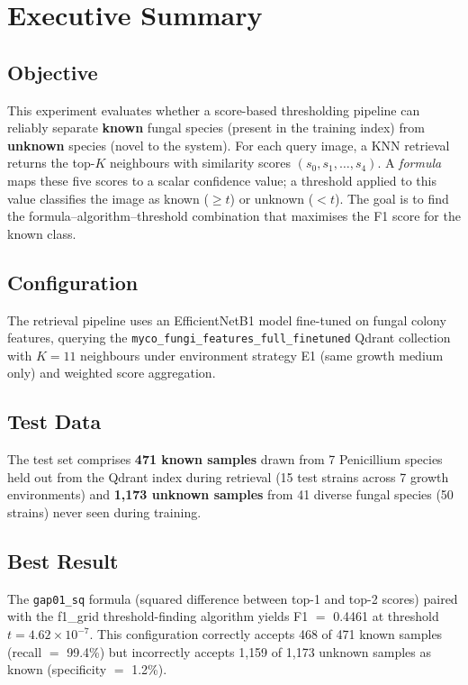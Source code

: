 \documentclass[11pt,a4paper]{article}
\newcommand{\formula}[1]{\texttt{#1}}
\newcommand{\algo}[1]{\textsf{#1}}
\newcommand{\bestf}{0.4461}
\begin{document}
\section{Executive Summary}

\subsection{Objective}

This experiment evaluates whether a score-based thresholding pipeline can reliably separate \textbf{known} fungal species (present in the training index) from \textbf{unknown} species (novel to the system). For each query image, a KNN retrieval returns the top-$K$ neighbours with similarity scores $(s_0, s_1, \ldots, s_4)$. A \emph{formula} maps these five scores to a scalar confidence value; a threshold applied to this value classifies the image as known ($\geq t$) or unknown ($<t$). The goal is to find the formula--algorithm--threshold combination that maximises the F1 score for the known class.

\subsection{Configuration}

The retrieval pipeline uses an EfficientNetB1 model fine-tuned on fungal colony features, querying the \texttt{myco\_fungi\_features\_full\_finetuned} Qdrant collection with $K=11$ neighbours under environment strategy E1 (same growth medium only) and weighted score aggregation.

\subsection{Test Data}

The test set comprises \textbf{471 known samples} drawn from 7 Penicillium species held out from the Qdrant index during retrieval (15 test strains across 7 growth environments) and \textbf{1{,}173 unknown samples} from 41 diverse fungal species (50 strains) never seen during training.

\subsection{Best Result}

The \formula{gap01\_sq} formula (squared difference between top-1 and top-2 scores) paired with the \algo{f1\_grid} threshold-finding algorithm yields F1 $=$ \bestf{} at threshold $t = 4.62 \times 10^{-7}$. This configuration correctly accepts 468 of 471 known samples (recall $=$ 99.4\%) but incorrectly accepts 1{,}159 of 1{,}173 unknown samples as known (specificity $=$ 1.2\%).
\end{document}
